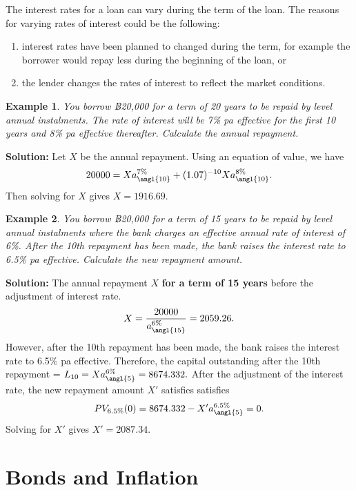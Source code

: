 \documentclass[
]{book}
\theoremstyle{definition}
\theoremstyle{definition}
\newtheorem{example}{Example}[chapter]
\theoremstyle{definition}
\theoremstyle{definition}
\theoremstyle{remark}
\begin{document}
The interest rates for a loan can vary during the term of the loan. The
reasons for varying rates of interest could be the following:

\begin{enumerate}
\def\labelenumi{\arabic{enumi}.}
\item
  interest rates have been planned to changed during the term, for
  example the borrower would repay less during the beginning of the
  loan, or
\item
  the lender changes the rates of interest to reflect the market
  conditions.
\end{enumerate}

\begin{example}
\emph{You borrow ฿20,000 for a term of 20 years to be repaid by level annual
instalments. The rate of interest will be 7\% pa effective for the first
10 years and 8\% pa effective thereafter. Calculate the annual
repayment.}
\end{example}

\textbf{Solution:} Let \(X\) be the annual repayment. Using an equation of
value, we have
\[20000 = X a^{7\%}_{\angl{10}} + (1.07)^{-10} X a^{8\%}_{\angl{10}}.\]
Then solving for \(X\) gives \(X = 1916.69\).

\begin{example}
\emph{You borrow ฿20,000 for a term of 15 years to be repaid by level annual
instalments where the bank charges an effective annual rate of interest
of 6\%. After the 10th repayment has been made, the bank raises the
interest rate to 6.5\% pa effective. Calculate the new repayment amount.}
\end{example}

\textbf{Solution:} The annual repayment \(X\) \textbf{for a term of 15 years} before
the adjustment of interest rate.
\[X = \frac{20000}{a^{6\%}_{\angl{15}}} = 2059.26.\] However, after the
10th repayment has been made, the bank raises the interest rate to 6.5\%
pa effective. Therefore, the capital outstanding after the 10th
repayment = \(L_{10} = X a^{6\%}_{\angl{5}} = 8674.332.\) After the
adjustment of the interest rate, the new repayment amount \(X'\) satisfies
satisfies \[PV_{6.5\%}(0) = 8674.332 - X' a^{6.5\%}_{\angl{5}} = 0.\]
Solving for \(X'\) gives \(X' = 2087.34\).

\hypertarget{bonds-and-inflation}{%
\chapter{Bonds and Inflation}\label{bonds-and-inflation}}
\end{document}
